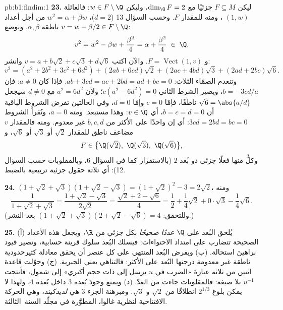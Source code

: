 \begin{solution}{pb:b1:findim:1}
\textbf{23.} ليكن $F \subseteq M$  جزئيًا مع $\dim_\Q F =
2$، وليكن $w \in F \setminus \Q$: فالعائلة $(1, w)$ ، ومنه 
للمقدار $F$. وحسب السؤال 13 ($d = 2$)، $w^2 = \alpha + \beta w$ من أجل
أعداد ناطقة $\alpha, \beta$. وبوضع $v = w - \beta/2 \in F
\setminus \Q$:
\[
v^2 = w^2 - \beta w + \frac{\beta^2}4 = \alpha + \frac{\beta^2}4
\;\in\; \Q,
\]
و $F = \operatorname{Vect}(1, v)$. والآن اكتب $v = a + b\sqrt2 +
c\sqrt3 + d\sqrt6$ وانشر:
\[
v^2 = (a^2 + 2b^2 + 3c^2 + 6d^2)
+ (2ab + 6cd)\sqrt2 + (2ac + 4bd)\sqrt3 + (2ad + 2bc)\sqrt6 .
\]
وتنعدم  الصمّاء الثلاث: $ab + 3cd = ac + 2bd =
ad + bc = 0$. فإذا كان $a \neq 0$: فإن $b = -3cd/a$، ويصير الشرط
الثاني $c(a^2 - 6d^2) = 0$؛ ولأن $a^2 = 6d^2$ مع $d
\neq 0$ سيجعل $\sqrt6 = \abs{a/d}$ ناطقًا، فإمّا $c = 0$
وإمّا $d = 0$، وفي الحالتين تفرض الشروط الباقية أن $b =
c = d = 0$، أي $v \in \Q$: وهذا مستبعد. ومنه $a = 0$، وتُقرأ
الشروط $3cd = 2bd = bc = 0$: أي إن واحدًا على الأكثر من $b, c, d$
غير معدوم. ومنه فالمقدار $v$ مضاعف ناطق للمقدار $\sqrt2$ أو $\sqrt3$
أو $\sqrt6$، و
\[
F \in \bigl\{\Q(\sqrt2),\ \Q(\sqrt3),\ \Q(\sqrt6)\bigr\} ,
\]
وكلٌّ منها فعلًا  جزئي ذو بُعد $2$ (بالاستقرار كما
في السؤال 6، وبالمقلوبات حسب السؤال 12): أي ثلاثة حقول جزئية
تربيعية بالضبط.

\textbf{24.} $(1 + \sqrt2 + \sqrt3)(1 + \sqrt2 - \sqrt3) = (1 +
\sqrt2)^2 - 3 = 2\sqrt2$، ومنه
\[
\frac1{1 + \sqrt2 + \sqrt3}
= \frac{1 + \sqrt2 - \sqrt3}{2\sqrt2}
= \frac{\sqrt2 + 2 - \sqrt6}{4}
= \frac12 + \frac14\sqrt2 + 0\cdot\sqrt3 - \frac14\sqrt6 .
\]
(وللتحقق: $(1 + \sqrt2 + \sqrt3)(2 + \sqrt2 - \sqrt6) = 4$ بعد
النشر.)

\textbf{25.} (أ) يُلحق البُعد على $\Q$ \emph{عددًا صحيحًا} بكل
 جزئي من $\R$، ويجعل  هذه الأعداد الصحيحة
تتضارب على امتداد الاحتواءات: فيسلك البُعد سلوك قرينة
حسابية، وتصير قيود  براهينَ استحالة.
(ب) ويفرض البُعد المنتهي على كل عنصر أن يحقق
معادلة كثيرحدودية ناطقة غير معدومة درجتها البُعد على
الأكثر: فالتناهي يعني الجبرية. (ج) وحوّلت
قاعدة اثنين من ثلاثة عبارةَ «الضرب في $u$ يرسل 
إلى  ذات حجم أكبري» إلى شمول، فأنتجت
$u^{-1}$ بلا صيغة: فالمقلوبات جاءت من العدّ. (د) ويمنع
 وجودَ  بُعده $3$ داخل
 بُعده $4$، ولهذا لا يمكن بلوغ $2^{1/3}$
انطلاقًا من $\sqrt2$ و $\sqrt3$. ومبرهنة الجزء 3 هي
\emph{ لديدكيند}، وهي الحركة الافتتاحية لنظرية غالوا،
المطوَّرة في مجلّد السنة~الثالثة.
\end{solution}
